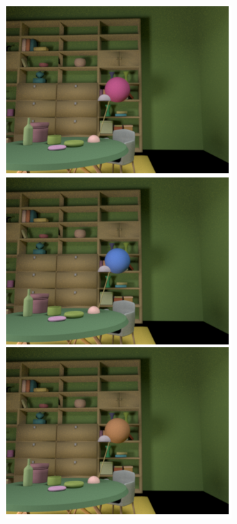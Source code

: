 \documentclass{jov}
\begin{document}
\begin{figure}
\begin{subfigure}[b]{0.18 \textwidth}
        \includegraphics[width=\textwidth]{../Figures/Figure5/Figure5_a.png}

\end{subfigure}
\end{figure}
\end{document}
